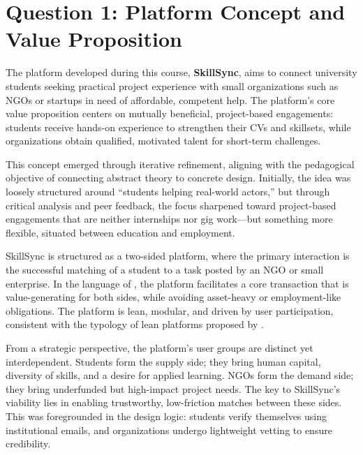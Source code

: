 \documentclass[12pt,a4paper]{article}
\begin{document}
\setcounter{secnumdepth}{-1}
\makeatletter
\renewcommand{\numberline}[1]{}
\makeatother

\tableofcontents
\newpage

\section*{Question 1: Platform Concept and Value Proposition}

The platform developed during this course, \textbf{SkillSync}, aims to connect university students seeking practical project experience with small organizations such as NGOs or startups in need of affordable, competent help. The platform's core value proposition centers on mutually beneficial, project-based engagements: students receive hands-on experience to strengthen their CVs and skillsets, while organizations obtain qualified, motivated talent for short-term challenges.

This concept emerged through iterative refinement, aligning with the pedagogical objective of connecting abstract theory to concrete design. Initially, the idea was loosely structured around ``students helping real-world actors,'' but through critical analysis and peer feedback, the focus sharpened toward project-based engagements that are neither internships nor gig work---but something more flexible, situated between education and employment.

SkillSync is structured as a two-sided platform, where the primary interaction is the successful matching of a student to a task posted by an NGO or small enterprise. In the language of \citet{Choudary2016}, the platform facilitates a core transaction that is value-generating for both sides, while avoiding asset-heavy or employment-like obligations. The platform is lean, modular, and driven by user participation, consistent with the typology of lean platforms proposed by \citet{Srnicek2017}.

From a strategic perspective, the platform's user groups are distinct yet interdependent. Students form the supply side; they bring human capital, diversity of skills, and a desire for applied learning. NGOs form the demand side; they bring underfunded but high-impact project needs. The key to SkillSync’s viability lies in enabling trustworthy, low-friction matches between these sides. This was foregrounded in the design logic: students verify themselves using institutional emails, and organizations undergo lightweight vetting to ensure credibility.
\end{document}
